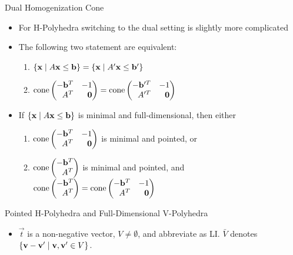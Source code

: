 \documentclass{beamer}
\begin{document}
\begin{frame}{Dual Homogenization Cone}
\begin{itemize}
  \item<1-> For H-Polyhedra switching to the dual setting is slightly more complicated
  \item<2-> 	The following two statement are equivalent:
    \begin{enumerate}
      \item $\left\{\mathbf{x}\;|\; A\mathbf{x}\leq \mathbf{b}\right\} = \left\{\mathbf{x}\;|\; A'\mathbf{x}\leq \mathbf{b}'\right\}$
      \item $\cone \pmb -\vec{b}^T & -1 \\ A^T & \0 \pme = \cone \pmb -\vec{b}'^T & -1 \\ A'^T & \0 \pme$
    \end{enumerate}
  \item<3-> If $\left\{\mathbf{x}\;|\; A\mathbf{x}\leq \mathbf{b}\right\}$ is minimal and full-dimensional, then either 
    \begin{enumerate}
      \item $\cone \pmb -\vec{b}^T & -1 \\ A^T & \0 \pme$ is minimal and pointed, or
      \item $\cone \pmb -\vec{b}^T \\ A^T \pme$ is minimal and pointed, and $\cone\pmb -\vec{b}^T \\ A^T \pme = \cone \pmb -\vec{b}^T & -1 \\ A^T & \0 \pme$
    \end{enumerate}
\end{itemize}
\end{frame}

\begin{frame}{Pointed H-Polyhedra and Full-Dimensional V-Polyhedra}
\begin{itemize}
  \item $\vec{t}$ is a non-negative vector, $V \neq \emptyset$, and abbreviate {\LI} as LI. $\bar V$ denotes $\{\mathbf{v}-\mathbf{v}'\;|\;\mathbf{v},\mathbf{v}'\in V\}$.\\

  \renewcommand{\arraystretch}{1.3}
\end{itemize}
\end{frame}
\end{document}
